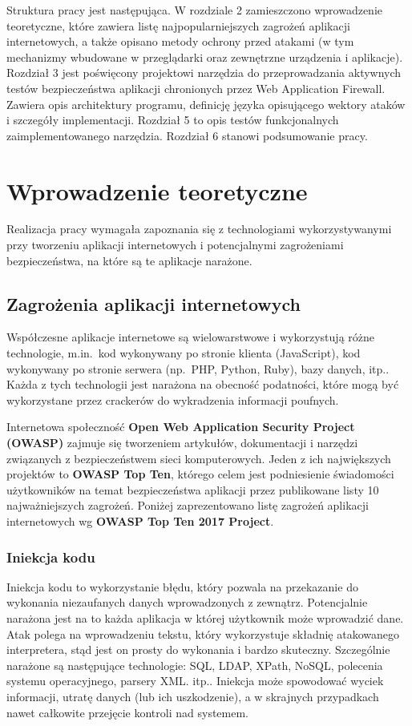 \documentclass[11pt,a4paper,polish,thesis]{dcsbook}
\begin{document}
Struktura pracy jest następująca. W rozdziale 2 zamieszczono wprowadzenie teoretyczne, które zawiera listę najpopularniejszych zagrożeń aplikacji internetowych, a także opisano metody ochrony przed atakami (w tym mechanizmy wbudowane w przeglądarki oraz zewnętrzne urządzenia i aplikacje). Rozdział 3 jest poświęcony projektowi narzędzia do przeprowadzania aktywnych testów bezpieczeństwa aplikacji chronionych przez Web Application Firewall. Zawiera opis architektury programu, definicję języka opisującego wektory ataków i szczegóły implementacji. Rozdział 5 to opis testów funkcjonalnych zaimplementowanego narzędzia. Rozdział 6 stanowi podsumowanie pracy.


\chapter{Wprowadzenie teoretyczne}
Realizacja pracy wymagała zapoznania się z technologiami wykorzystywanymi przy tworzeniu aplikacji internetowych i potencjalnymi zagrożeniami bezpieczeństwa, na które są te aplikacje narażone.
\section{Zagrożenia aplikacji internetowych}
Współczesne aplikacje internetowe są wielowarstwowe i wykorzystują różne technologie, m.in.~kod wykonywany po stronie klienta (JavaScript), kod wykonywany po stronie serwera (np.~PHP, Python, Ruby), bazy danych, itp.. Każda z tych technologii jest narażona na obecność podatności, które mogą być wykorzystane przez crackerów do wykradzenia informacji poufnych.

Internetowa społeczność \textbf{Open Web Application Security Project (OWASP)}\cite{owasp} zajmuje się tworzeniem artykułów, dokumentacji i narzędzi związanych z bezpieczeństwem sieci komputerowych. Jeden z ich największych projektów to \textbf{OWASP Top Ten}, którego celem jest podniesienie świadomości użytkowników na temat bezpieczeństwa aplikacji przez publikowane listy 10 najważniejszych zagrożeń. Poniżej zaprezentowano listę zagrożeń aplikacji internetowych wg \textbf{OWASP Top Ten 2017 Project}.

\subsection{Iniekcja kodu}
Iniekcja kodu to wykorzystanie błędu, który pozwala na przekazanie do wykonania niezaufanych danych wprowadzonych z zewnątrz. Potencjalnie narażona jest na to każda aplikacja w której użytkownik może wprowadzić dane. Atak polega na wprowadzeniu tekstu, który wykorzystuje składnię atakowanego interpretera, stąd jest on prosty do wykonania i bardzo skuteczny. Szczególnie narażone są następujące technologie: SQL, LDAP, XPath, NoSQL, polecenia systemu operacyjnego, parsery XML. itp.. Iniekcja może spowodować wyciek informacji, utratę danych (lub ich uszkodzenie), a w skrajnych przypadkach nawet całkowite przejęcie kontroli nad systemem.
\end{document}
